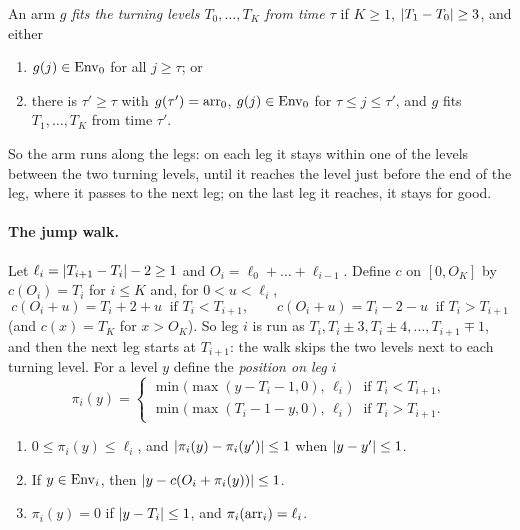 \begin{definition}[Fitting]\label{def:fit}
An arm $g$ \emph{fits the turning levels $T_0,\dots,T_K$ from time $\tau$} if $K\ge1$, $\left\lvert T_1-T_0\right\rvert\ge3$, and either
\begin{enumerate}[label=(F\arabic*)]
\item $g(j)\in\operatorname{Env}_0$ for all $j\ge\tau$; or
\item there is $\tau'\ge\tau$ with $g(\tau')=\operatorname{arr}_0$, $g(j)\in\operatorname{Env}_0$ for $\tau\le j\le\tau'$, and $g$ fits $T_1,\dots,T_K$ from time $\tau'$.
\end{enumerate}
\end{definition}

So the arm runs along the legs: on each leg it stays within one of the levels between the two turning levels, until it
reaches the level just before the end of the leg, where it passes to the next leg; on the last leg it reaches, it stays
for good.


\paragraph{The jump walk.} Let $\ell_i=\left\lvert T_{i+1}-T_i\right\rvert-2\ge1$ and $O_i=\ell_0+\dots+\ell_{i-1}$. Define $c$ on $[0,O_K]$ by
$c(O_i)=T_i$ for $i\le K$ and, for $0<u<\ell_i$,
\[
c(O_i+u)=T_i+2+u\ \text{ if }T_i<T_{i+1},\qquad c(O_i+u)=T_i-2-u\ \text{ if }T_i>T_{i+1}
\]
(and $c(x)=T_K$ for $x>O_K$). So leg $i$ is run as $T_i,T_i\pm3,T_i\pm4,\dots,T_{i+1}\mp1$, and then the next leg starts at
$T_{i+1}$: the walk skips the two levels next to each turning level. For a level $y$ define the \emph{position on leg $i$}
\[
\pi_i(y)=\begin{cases}\min\bigl(\max(y-T_i-1,0),\,\ell_i\bigr)&\text{if }T_i<T_{i+1},\\
\min\bigl(\max(T_i-1-y,0),\,\ell_i\bigr)&\text{if }T_i>T_{i+1}.\end{cases}
\]

\begin{lemma}\label{lem:legpos}
\begin{enumerate}[label=(\alph*)]
\item $0\le\pi_i(y)\le\ell_i$, and $\left\lvert \pi_i(y)-\pi_i(y')\right\rvert\le1$ when $\left\lvert y-y'\right\rvert\le1$.
\item If $y\in\operatorname{Env}_i$, then $\left\lvert y-c(O_i+\pi_i(y))\right\rvert\le1$.
\item $\pi_i(y)=0$ if $\left\lvert y-T_i\right\rvert\le1$, and $\pi_i(\operatorname{arr}_i)=\ell_i$.
\end{enumerate}
\end{lemma}

